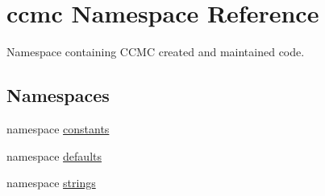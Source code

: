 \hypertarget{namespaceccmc}{\section{ccmc Namespace Reference}
\label{namespaceccmc}
}


Namespace containing C\-C\-M\-C created and maintained code.  


\subsection*{Namespaces}
\begin{DoxyCompactItemize}
\item 
namespace \hyperlink{namespaceccmc_1_1constants}{constants}
\item 
namespace \hyperlink{namespaceccmc_1_1defaults}{defaults}
\item 
namespace \hyperlink{namespaceccmc_1_1strings}{strings}
\end{DoxyCompactItemize}
